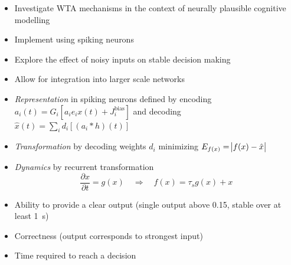 \documentclass[final]{beamer}
\begin{document}
\begin{frame}[t]
    \begin{tcbraster}[raster columns=4, raster column skip=10mm, raster row skip=10mm, raster equal height=rows, raster force size=false]
        \begin{tcolorbox}[title=Motivation, add to width=-2cm]
            \begin{itemize}
                \item Investigate WTA mechanisms in the context of neurally plausible cognitive modelling
                \item Implement using spiking neurons
                \item Explore the effect of noisy inputs on stable decision making
                \item Allow for integration into larger scale networks
            \end{itemize}
        \end{tcolorbox}
        \begin{tcolorbox}[title=Neural Engineering Framework, add to width=5cm]
            \begin{itemize}
                \item \emph{Representation} in spiking neurons defined by encoding
                        $a_i(t) = G_i\left[a_i e_i x(t) + J_i^{\mathrm{bias}} \right]$
                        and decoding
                        $\hat{x}(t) = \sum_i d_i \left[(a_i * h)(t) \right]$
                \item \emph{Transformation} by decoding weights $d_i$ minimizing $E_{f(x)} = \abs{f(x) - \hat{x}}$
                \item \emph{Dynamics} by recurrent transformation
                    \begin{equation*}
                        \frac{\partial x}{\partial t} = g(x) \quad\Rightarrow\quad f(x) = \tau_s g(x) + x
                    \end{equation*}
            \end{itemize}
        \end{tcolorbox}
        \begin{tcolorbox}[title=Benchmarks, add to width=-3cm]
            \begin{itemize}
                \item Ability to provide a clear output (single output above \num{0.15}, stable over at least \SI{1}{\second})
                \item Correctness (output corresponds to strongest input)
                \item Time required to reach a decision

\end{itemize}
\end{tcolorbox}
\end{tcbraster}
\end{frame}
\end{document}
